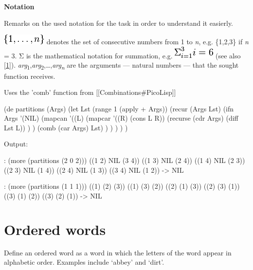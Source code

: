 \pagebreak{}

\textbf{Notation}

Remarks on the used notation for the task in order to understand it
easierly.

\includegraphics[scale=.6]{graphics/02617b75af4d512caf92071211ac3d6a.png}
denotes the set of consecutive numbers from 1 to \emph{n}, e.g.
\{1,2,3\} if \emph{n} = 3. Σ is the mathematical notation for summation,
e.g.
\includegraphics[scale=.6]{graphics/65027d595737121ba207f647f86dfe09.png}
(see also
\href{http://en.wikipedia.org/wiki/Summation\#Capital-sigma\_notation}{{[}1{]}}).
\emph{a}\emph{r}\emph{g}\textsubscript{1},\emph{a}\emph{r}\emph{g}\textsubscript{2},\ldots{},\emph{a}\emph{r}\emph{g}\textsubscript{\emph{n}}
are the arguments --- natural numbers --- that the sought function
receives.

\begin{wideverbatim}

Uses the 'comb' function from [[Combinations#PicoLisp]]

(de partitions (Args)
   (let Lst (range 1 (apply + Args))
      (recur (Args Lst)
         (ifn Args
            '(NIL)
            (mapcan
               '((L)
                  (mapcar
                     '((R) (cons L R))
                     (recurse (cdr Args) (diff Lst L)) ) )
               (comb (car Args) Lst) ) ) ) ) )

Output:

: (more (partitions (2 0 2)))
((1 2) NIL (3 4))
((1 3) NIL (2 4))
((1 4) NIL (2 3))
((2 3) NIL (1 4))
((2 4) NIL (1 3))
((3 4) NIL (1 2))
-> NIL

: (more (partitions (1 1 1)))
((1) (2) (3))
((1) (3) (2))
((2) (1) (3))
((2) (3) (1))
((3) (1) (2))
((3) (2) (1))
-> NIL

\end{wideverbatim}

\pagebreak{}
\section*{Ordered words}

Define an ordered word as a word in which the letters of the word appear
in alphabetic order. Examples include `abbey' and `dirt'.

